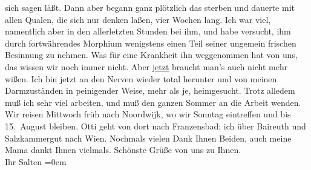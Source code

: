 \begin{ledgroupsized}[t]{13cm}
               sich sagen läßt. Dann aber begann ganz plötzlich das sterben und dauerte mit allen
               Qualen, die sich nur denken laßen, vier Wochen lang. Ich war viel, namentlich aber in
               den allerletzten Stunden bei ihm, und habe versucht, ihm durch fortwährendes Morphium
               wenigstens einen Teil seiner ungemein frischen Besinnung zu nehmen. Was für eine
               Krankheit ihn weggenommen hat von uns, das wissen wir noch immer nicht. Aber \uline{jetzt} braucht man’s auch nicht mehr wißen. Ich bin
               jetzt an den Nerven wieder total herunter und von meinen Darmzuständen in peinigender
               Weise, mehr als je, heimgesucht. Trotz alledem muß ich sehr viel arbeiten, und muß
               den ganzen Sommer an die Arbeit wenden. Wir reisen Mittwoch{ }früh nach Noordwijk, wo wir Sonntag eintreffen und bis 15. August bleiben. Otti geht von
               dort nach Franzensbad; ich über Baireuth und Salzkammergut
               nach Wien.\pend
           \pstart
           Nochmals vielen Dank Ihnen Beiden, auch meine Mama dankt Ihnen vielmals. Schönste Grüße von uns zu Ihnen. {\\[\baselineskip]}Ihr
                  \spacefill\mbox{Salten}\pend
           \leftskip=0em{}
         
         \endnumbering{}\end{ledgroupsized}  \newcommand{\dateiname}{L03497}\newcommand{\titel}{Felix Salten an Arthur Schnitzler, 5. 7. 1908}\newcommand{\editorInnen}{Martin Anton Müller und Laura Untner}
      